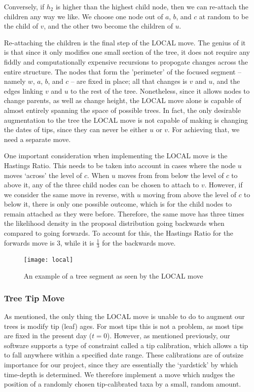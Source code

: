 \documentclass[10pt,journal,compsoc]{IEEEtran}
\begin{document}
Conversely, if $h_2$ is higher than the highest child node, then we can re-attach the children any way we like. We choose one node out of $a$, $b$, and $c$ at random to be the child of $v$, and the other two become the children of $u$.

Re-attaching the children is the final step of the LOCAL move. The genius of it is that since it only modifies one small section of the tree, it does not require any fiddly and computationally expensive recursions to propogate changes across the entire structure. The nodes that form the 'perimeter' of the focused segment -- namely $w$, $a$, $b$, and $c$ -- are fixed in place; all that changes is $v$ and $u$, and the edges linking $v$ and $u$ to the rest of the tree. Nonetheless, since it allows nodes to change parents, as well as change height, the LOCAL move alone is capable of almost entirely spanning the space of possible trees. In fact, the only desirable augmentation to the tree the LOCAL move is not capable of making is changing the dates of tips, since they can never be either $u$ or $v$. For achieving that, we need a separate move.

One important consideration when implementing the LOCAL move is the Hastings Ratio. This needs to be taken into account in cases where the node $u$ moves `across' the level of $c$. When $u$ moves from from below the level of $c$ to above it, any of the three child nodes can be chosen to attach to $v$. However, if we consider the same move in reverse, with $u$ moving from above the level of $c$ to below it, there is only one possible outcome, which is for the child nodes to remain attached as they were before. Therefore, the same move has three times the likelihood density in the proposal distribution going backwards when compared to going forwards. To account for this, the Hastings Ratio for the forwards move is $3$, while it is $\frac{1}{3}$ for the backwards move. 
\begin{figure}
\caption{An example of a tree segment as seen by the LOCAL move}\label{fig:local}
\vspace{0.2cm}
\texttt{[image: local]}
\end{figure}

\subsubsection{Tree Tip Move}
As mentioned, the only thing the LOCAL move is unable to do to augment our trees is modify tip (leaf) ages. For most tips this is not a problem, as most tips are fixed in the present day ($t = 0$). However, as mentioned previously, our software supports a type of constraint called a tip calibration, which allows a tip to fall anywhere within a specified date range. These calibrations are of outsize importance for our project, since they are essentially the `yardstick' by which time-depth is determined. We therefore implement a move which nudges the position of a randomly chosen tip-calibrated taxa by a small, random amount.
\end{document}
